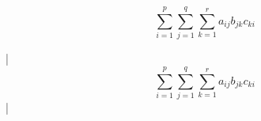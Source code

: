 

\bigskip


$$\sum^{p}_{i = 1} \sum^{q}_{j = 1} \sum^{r}_{k = 1}a_{ij}b_{jk}c_{ki}$$

\bigskip

\respuestaS
|$$\sum^{p}_{i = 1} \sum^{q}_{j = 1} \sum^{r}_{k = 1}a_{ij}b_{jk}c_{ki}$$|

\bye

